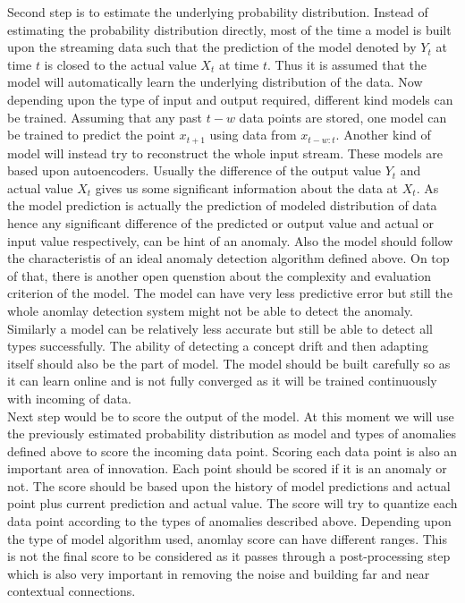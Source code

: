 \documentclass[12pt]{article}
\begin{document}
Second step is to estimate the underlying probability distribution. Instead of estimating the probability distribution directly, most of the time a model is built upon the streaming data such that the prediction of the model denoted by $Y_t$ at time $t$ is closed to the actual value $X_t$ at time $t$. Thus it is assumed that the model will automatically learn the underlying distribution of the data. Now depending upon the type of input and output required, different kind models can be trained. Assuming that any past $t-w$ data points are stored, one model can be trained to predict the point $x_{t+1}$ using data from $x_{t-w:t}$. Another kind of model will instead try to reconstruct the whole input stream. These models are based upon autoencoders. Usually the difference of the output value $Y_t$ and actual value $X_t$ gives us some significant information about the data at $X_t$. As the model prediction is actually the prediction of modeled distribution of data hence any significant difference of the predicted or output value and actual or input value respectively, can be hint of an anomaly. Also the model should follow the characteristis of an ideal anomaly detection algorithm defined above. On top of that, there is another open quenstion about the complexity and evaluation criterion of the model. The model can have very less predictive error but still the whole anomlay detection system might not be able to detect the anomaly. Similarly a model can be relatively less accurate but still be able to detect all types successfully. The ability of detecting a concept drift and then adapting itself should also be the part of model. The model should be built carefully so as it can learn online and is not fully converged as it will be trained continuously with incoming of data.\\
\break
Next step would be to score the output of the model. At this moment we will use the previously estimated probability distribution as model and types of anomalies defined above to score the incoming data point. Scoring each data point is also an important area of innovation. Each point should be scored if it is an anomaly or not. The score should be based upon the history of model predictions and actual point plus current prediction and actual value. The score will try to quantize each data point according to the types of anomalies described above. Depending upon the type of model algorithm used, anomlay score can have different ranges. This is not the final score to be considered as it passes through a post-processing step which is also very important in removing the noise and building far and near contextual connections.\\
\end{document}
